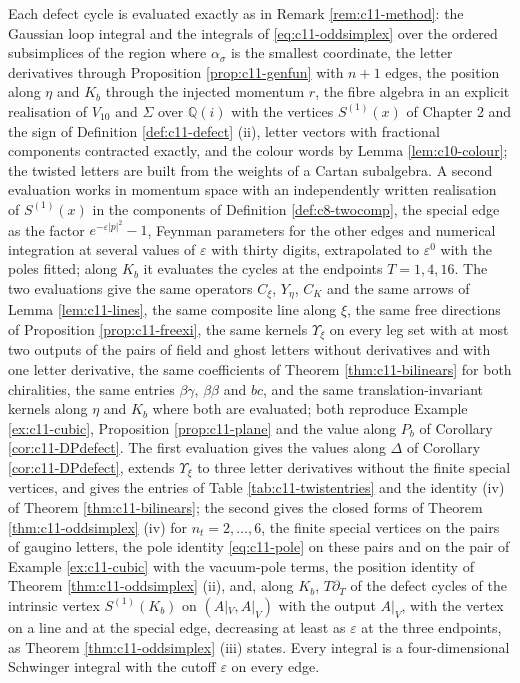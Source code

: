 \begin{remark}
\label{rem:c11-oddmethod}
Each defect cycle is evaluated exactly as in Remark \ref{rem:c11-method}: the Gaussian loop integral and the integrals of \eqref{eq:c11-oddsimplex} over the ordered subsimplices of the region where $\alpha_\sigma$ is the smallest coordinate, the letter derivatives through Proposition \ref{prop:c11-genfun} with $n+1$ edges, the position along $\eta$ and $K_b$ through the injected momentum $r$, the fibre algebra in an explicit realisation of $V_{10}$ and $\Sigma$ over $\mathbb Q(i)$ with the vertices $S^{(1)}(x)$ of Chapter 2 and the sign of Definition \ref{def:c11-defect} (ii), letter vectors with fractional components contracted exactly, and the colour words by Lemma \ref{lem:c10-colour}; the twisted letters are built from the weights of a Cartan subalgebra. A second evaluation works in momentum space with an independently written realisation of $S^{(1)}(x)$ in the components of Definition \ref{def:c8-twocomp}, the special edge as the factor $e^{-\varepsilon|p|^2}-1$, Feynman parameters for the other edges and numerical integration at several values of $\varepsilon$ with thirty digits, extrapolated to $\varepsilon^0$ with the poles fitted; along $K_b$ it evaluates the cycles at the endpoints $T=1,4,16$. The two evaluations give the same operators $C_\xi$, $Y_\eta$, $C_K$ and the same arrows of Lemma \ref{lem:c11-lines}, the same composite line along $\xi$, the same free directions of Proposition \ref{prop:c11-freexi}, the same kernels $\Upsilon_\xi$ on every leg set with at most two outputs of the pairs of field and ghost letters without derivatives and with one letter derivative, the same coefficients of Theorem \ref{thm:c11-bilinears} for both chiralities, the same entries $\beta\gamma$, $\beta\beta$ and $bc$, and the same translation-invariant kernels along $\eta$ and $K_b$ where both are evaluated; both reproduce Example \ref{ex:c11-cubic}, Proposition \ref{prop:c11-plane} and the value along $P_b$ of Corollary \ref{cor:c11-DPdefect}. The first evaluation gives the values along $\Delta$ of Corollary \ref{cor:c11-DPdefect}, extends $\Upsilon_\xi$ to three letter derivatives without the finite special vertices, and gives the entries of Table \ref{tab:c11-twistentries} and the identity (iv) of Theorem \ref{thm:c11-bilinears}; the second gives the closed forms of Theorem \ref{thm:c11-oddsimplex} (iv) for $n_t=2,\dots,6$, the finite special vertices on the pairs of gaugino letters, the pole identity \eqref{eq:c11-pole} on these pairs and on the pair of Example \ref{ex:c11-cubic} with the vacuum-pole terms, the position identity of Theorem \ref{thm:c11-oddsimplex} (ii), and, along $K_b$, $T\partial_T$ of the defect cycles of the intrinsic vertex $S^{(1)}(K_b)$ on $(A|_V,A|_V)$ with the output $A|_V$, with the vertex on a line and at the special edge, decreasing at least as $\varepsilon$ at the three endpoints, as Theorem \ref{thm:c11-oddsimplex} (iii) states. Every integral is a four-dimensional Schwinger integral with the cutoff $\varepsilon$ on every edge.
\end{remark}

